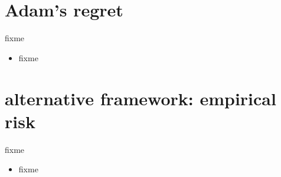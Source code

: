 \documentclass[xcolor={svgnames},
               hyperref={colorlinks,citecolor=DeepPink4,linkcolor=FireBrick,urlcolor=Maroon}]
               {beamer}
\begin{document}
\section{Adam's regret}

\begin{frame}{fixme}

\begin{itemize}
\item fixme
\end{itemize}
\end{frame}


\section{alternative framework: empirical risk}

\begin{frame}{fixme}

\begin{itemize}
\item fixme
\end{itemize}
\end{frame}
\end{document}
